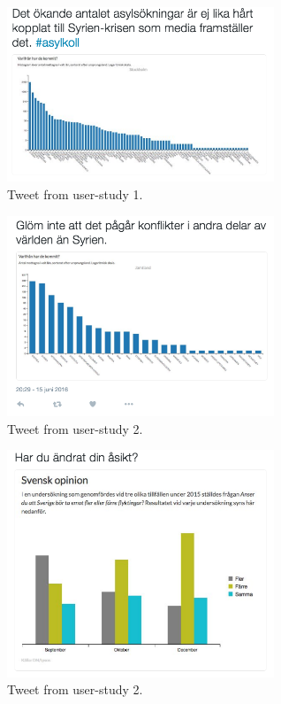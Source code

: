 \documentclass{acmtog} %
\begin{document}
\begin{figure}
\centering
\includegraphics[width=8cm]{img/tweet1_4.png}
\caption{Tweet from user-study 1.}
\label{fig:tweet1_4}
\end{figure}

\begin{figure}
\centering
\includegraphics[width=8cm]{img/tweet2_1.png}
\caption{Tweet from user-study 2.}
\label{fig:tweet2_1}
\end{figure}

\begin{figure}
\centering
\includegraphics[width=8cm]{img/tweet2_2.png}
\caption{Tweet from user-study 2.}
\label{fig:tweet2_2}
\end{figure}
\end{document}
